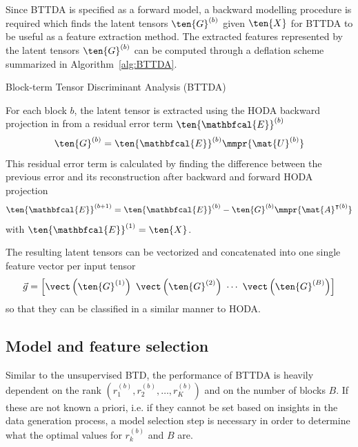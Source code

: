 Since BTTDA is specified as a forward model, a backward modelling
procedure is required which finds the latent tensors $\ten{G}^{(b)}$ given $\ten{X}$ for
BTTDA to be useful as a feature extraction method.
The extracted features represented by the latent tensors $\ten{G}^{(b)}$ can be
computed through a deflation scheme summarized in Algorithm~\ref{alg:BTTDA}.
\begin{algorithm}
	\caption{Block-term Tensor Discriminant Analysis (BTTDA)}
	\label{alg:BTTDA}
	
\end{algorithm}
For each block $b$, the latent tensor is extracted using the HODA backward
projection in from a residual error term
$\ten{\mathbfcal{E}}^{(b)}$
\begin{equation}
	\ten{G}^{(b)} = \ten{\mathbfcal{E}}^{(b)}\mmpr{\mat{U}^{(b)}}
\end{equation}
This residual error term is calculated by finding the difference between the
previous error and its reconstruction after backward and forward HODA
projection
\begin{equation}
	\ten{\mathbfcal{E}}^{(b+1)} = \ten{\mathbfcal{E}}^{(b)} - \ten{G}^{(b)}
	\mmpr{\mat{A}^{\intercal(b)}}
\end{equation}
with $\ten{\mathbfcal{E}}^{(1)}=\ten{X}$.

The resulting latent tensors can be vectorized and concatenated into
one single feature vector per input tensor
\begin{equation}
	\vec{g}
	=\left[\vect\left(\ten{G}^{(1)}\right)\
		\vect\left(\ten{G}^{(2)}\right)\
		\cdots\
		\vect\left(\ten{G}^{(B)}\right)\right]
\end{equation}
so that they can be classified in a similar manner to HODA.


\subsection{Model and feature selection}
Similar to the unsupervised BTD, the performance of BTTDA is
heavily dependent on the rank $(r_1^{(b)}, r_2^{(b)}, \ldots,
	r_K^{(b)})$ and on the number of blocks $B$.
If these are not known a priori, i.e. if they cannot be set based on insights in the
data generation process, a model selection step is necessary in order to
determine what the optimal values for $r_k^{(b)}$ and $B$ are.

